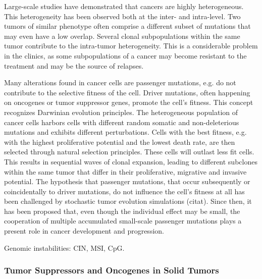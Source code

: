     Large-scale studies have demonstrated that cancers are highly heterogeneous.
    This heterogeneity has been observed both at the inter- and intra-level. Two
    tumors of similar phenotype often comprise a different subset of mutations
    that may even have a low overlap. Several clonal subpopulations within the
    same tumor contribute to the intra-tumor heterogeneity. This is a
    considerable problem in the clinics, as some subpopulations of a cancer may
    become resistant to the  treatment and may be the source of relapses.

    Many alterations found in cancer cells are passenger mutations, e.g. do not
    contribute to the selective fitness of the cell. Driver mutations, often
    happening on oncogenes or tumor suppressor genes, promote the cell's
    fitness. This concept recognizes Darwinian evolution principles. The
    heterogeneous  population of cancer cells harbors cells with different
    random somatic and non-deleterious mutations and exhibits different
    perturbations. Cells with the best fitness, e.g. with the highest
    proliferative potential  and the lowest death rate, are then selected
    through natural selection principles. These cells will outlast less fit
    cells. This results in  sequential waves of clonal expansion, leading to
    different subclones within the same tumor that differ in their
    proliferative, migrative and invasive potential. The hypothesis that
    passenger mutations, that occur subsequently or coincidentally to driver
    mutations, do not influence the cell's fitness at all has been
    challenged by stochastic tumor evolution simulations (citat). Since then,
    it has been proposed that, even though the individual effect may be
    small, the cooperation of multiple accumulated small-scale passenger
    mutations plays a present role in cancer development and progression.

    Genomic instabilities: CIN, MSI, CpG.

    \subsubsection{Tumor Suppressors and Oncogenes in Solid Tumors}


